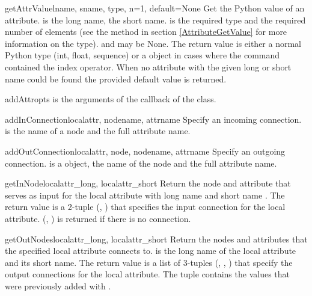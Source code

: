 \begin{methoddesc}{getAttrValue}{lname, sname, type, n=1, default=None}
Get the Python value of an attribute.
 is the long name,  the short name. 
is the required type and  the required number of elements 
(see the  method in section \ref{AttributeGetValue} for more information on the type). 
 and  may be None.
The return value is either a normal Python type (int, float, sequence)
or a  object in cases where the 
command contained the index operator. When no attribute with the given long
or short name could be found the provided default value is returned.
\end{methoddesc}

\begin{methoddesc}{addAttr}{opts}
 is the arguments of the  callback of 
the  class.
\end{methoddesc}

\begin{methoddesc}{addInConnection}{localattr, nodename, attrname}
Specify an incoming connection.
 is the name of a node and  the full 
attribute name.
\end{methoddesc}

\begin{methoddesc}{addOutConnection}{localattr, node, nodename, attrname}
Specify an outgoing connection.
 is a  object,  the name of the 
node and  the full attribute name.
\end{methoddesc}

\begin{methoddesc}{getInNode}{localattr_long, localattr_short}
Return the node and attribute that serves as input for the local
attribute with long name  and short name
. The return value is a 2-tuple (,
) that specifies the input connection for the 
local attribute. (, ) is returned if there is 
no connection.
\end{methoddesc}

\begin{methoddesc}{getOutNodes}{localattr_long, localattr_short}
Return the nodes and attributes that the specified local attribute
connects to.  is the long name of the local
attribute and  its short name.
The return value is a list of 3-tuples (, , 
) that specify the output connections for the
local attribute. The tuple contains the values that were previously
added with .
\end{methoddesc}

